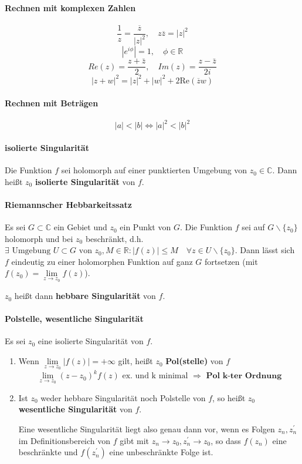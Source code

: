 \documentclass[a4paper, 10pt, DIV20, headings=small]{scrartcl}
\theoremstyle{definition}
\theoremstyle{plain}
\begin{document}
\paragraph{Rechnen mit komplexen Zahlen}
$$\frac{1}{z} = \frac{\overline{z}}{|z|^2}, \quad z \overline{z} = |z|^2$$
$$|e^{i \phi}| = 1, \quad \phi \in \mathbb{R}$$
$$Re(z) = \frac{z+\bar{z}}{2}, \quad Im(z) = \frac{z-\bar{z}}{2i}$$
$$|z+w|^2 = |z|^2+|w|^2 + 2 \text{Re}(\overline{z}w)$$

\paragraph{Rechnen mit Beträgen}
$$|a| < |b| \Leftrightarrow |a|^2 < |b|^2$$

\paragraph{isolierte Singularität}
Die Funktion $f$ sei holomorph auf einer punktierten Umgebung von
$z_0 \in \mathbb{C}$. Dann heißt $z_0$ \textbf{isolierte Singularität} von $f$. 

\paragraph{Riemannscher Hebbarkeitssatz}
Es sei $G \subset \mathbb{C}$ ein Gebiet und $z_0$ ein Punkt von $G$. Die Funktion $f$ sei auf $G \backslash \{z_0\}$ holomorph und bei $z_0$ beschränkt, d.h. $\exists \text{ Umgebung } U \subset G \text{ von } z_0, M \in \mathbb{R} \colon |f(z)| \leq M \quad \forall z \in U \backslash \{z_0\}$. Dann lässt sich $f$ eindeutig zu einer holomorphen Funktion auf ganz $G$ fortsetzen (mit $f(z_0) = \lim\limits_{z \rightarrow z_0} f(z)$).

$z_0$ heißt dann \textbf{hebbare Singularität} von $f$.

\paragraph{Polstelle, wesentliche Singularität}
Es sei $z_0$ eine isolierte Singularität von $f$.
\begin{enumerate}
\item Wenn $\lim\limits_{z \rightarrow z_0} |f(z)| = + \infty$ gilt, heißt $z_0$ \textbf{Pol(stelle)} von $f$
$$\lim\limits_{z \to z_0} (z-z_0)^k f(z) \text{ ex. und k minimal } \Rightarrow \textbf{ Pol k-ter Ordnung}$$
\item Ist $z_0$ weder hebbare Singularität noch Polstelle von $f$, so heißt $z_0$ \textbf{wesentliche Singularität} von $f$.

Eine wesentliche Singularität liegt also genau dann vor, wenn es Folgen $z_n, z_n^\prime$ im
Definitionsbereich von $f$ gibt mit $z_n \rightarrow z_0, z_n^\prime \rightarrow z_0$, so dass $f(z_n)$ eine beschränkte und $f(z_n^\prime)$ eine unbeschränkte Folge ist.

\end{enumerate}
\end{document}
